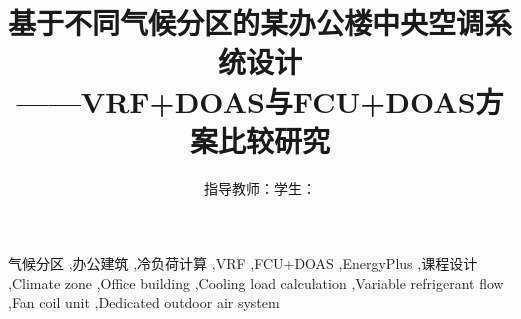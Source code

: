 \documentclass[preprint,12pt]{elsarticle}
\begin{document}
\begin{frontmatter}

\title{基于不同气候分区的某办公楼中央空调系统设计\\——VRF+DOAS与FCU+DOAS方案比较研究}

\author{指导教师：\quad 学生：}

\begin{highlights}

\end{highlights}

\begin{abstract}

\end{abstract}

\begin{keyword}
气候分区 \sep 办公建筑 \sep 冷负荷计算 \sep VRF \sep FCU+DOAS \sep EnergyPlus \sep 课程设计
\sep Climate zone \sep Office building \sep Cooling load calculation \sep Variable refrigerant flow \sep Fan coil unit \sep Dedicated outdoor air system
\end{keyword}

\end{frontmatter}














\end{document}
